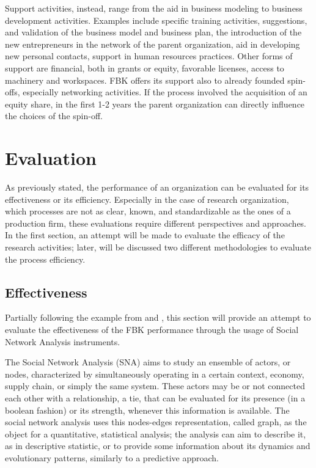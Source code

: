 Support activities, instead, range from the aid in business modeling to business development activities. Examples include specific training activities, suggestions, and validation of the business model and business plan, the introduction of the new entrepreneurs in the network of the parent organization, aid in developing new personal contacts, support in human resources practices. Other forms of support are financial, both in grants or equity, favorable licenses, access to machinery and workspaces. FBK offers its support also to already founded spin-offs, especially networking activities. If the process involved the acquisition of an equity share, in the first 1-2 years the parent organization can directly influence the choices of the spin-off.



\section{Evaluation}

As previously stated, the performance of an organization can be evaluated for its effectiveness or its efficiency. Especially in the case of research organization, which processes are not as clear, known, and standardizable as the ones of a production firm, these evaluations require different perspectives and approaches. In the first section, an attempt will be made to evaluate the efficacy of the research activities; later, will be discussed two different methodologies to evaluate the process efficiency. 

\subsection{Effectiveness}

Partially following the example from \citet{Giuliani2005} and \citet{Cantner2006}, this section will provide an attempt to evaluate the effectiveness of the FBK performance through the usage of Social Network Analysis instruments. 

The Social Network Analysis (SNA) aims to study an ensemble of actors, or nodes, characterized by simultaneously operating in a certain context, economy, supply chain, or simply the same system. These actors may be or not connected each other with a relationship, a tie, that can be evaluated for its presence (in a boolean fashion) or its strength, whenever this information is available. The social network analysis uses this nodes-edges representation, called graph, as the object for a quantitative, statistical analysis; the analysis can aim to describe it, as in descriptive statistic, or to provide some information about its dynamics and evolutionary patterns, similarly to a predictive approach.

